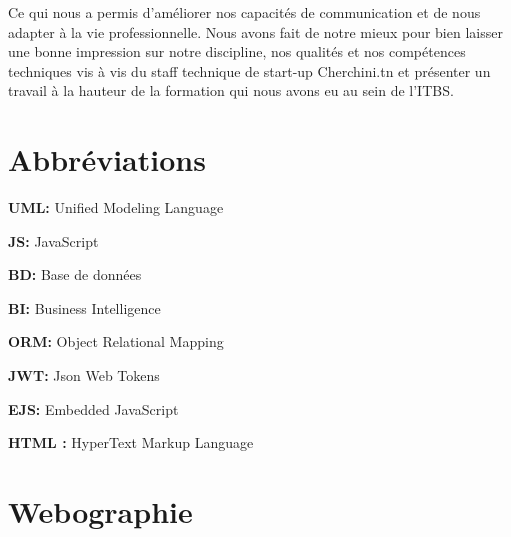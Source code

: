 Ce qui nous a permis d'am\'{e}liorer nos capacit\'{e}s de communication et de nous adapter \`{a} la vie professionnelle. Nous avons fait de notre mieux pour bien laisser une bonne impression sur notre discipline, nos qualit\'{e}s et nos comp\'{e}tences techniques vis \`{a} vis du staff technique de start-up Cherchini.tn et pr\'{e}senter un travail \`{a} la hauteur de la formation qui nous avons
eu au sein de l'ITBS.

\chapter*{Abbr\'{e}viations}
\bigskip

\textbf{UML: }
Unified Modeling Language
\newline

\textbf{JS: }
JavaScript
\newline

\textbf{BD: }
Base de données
\newline

\textbf{ BI:}
Business Intelligence
\newline

\textbf{ORM: }
Object Relational Mapping
\newline

\textbf{JWT: }
Json Web Tokens
\newline

\textbf{EJS: }
Embedded JavaScript
\newline


\textbf{HTML : }
HyperText Markup Language
\newline


\chapter*{Webographie}

